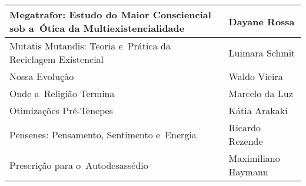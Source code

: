 \documentclass{gescons}
\begin{document}
\begin{longtable}[]{@{}
  >{\raggedright\arraybackslash}p{}
  >{\raggedright\arraybackslash}p{}@{}}
\hline
\begin{minipage}[b]{\linewidth}\raggedright
Megatrafor: Estudo do Maior Consciencial sob a~Ótica da Multiexistencialidade
\end{minipage} & \begin{minipage}[b]{\linewidth}\raggedright
Dayane Rossa
\end{minipage} \\
\hline
\begin{minipage}[b]{\linewidth}\raggedright
Mutatis Mutandis: Teoria e~Prática da Reciclagem Existencial
\end{minipage} & \begin{minipage}[b]{\linewidth}\raggedright
Luimara Schmit
\end{minipage} \\
\hline
\begin{minipage}[b]{\linewidth}\raggedright
Nossa Evolução
\end{minipage} & \begin{minipage}[b]{\linewidth}\raggedright
Waldo Vieira
\end{minipage} \\
\hline
\begin{minipage}[b]{\linewidth}\raggedright
Onde a~Religião Termina
\end{minipage} & \begin{minipage}[b]{\linewidth}\raggedright
Marcelo da Luz
\end{minipage} \\
\hline
\begin{minipage}[b]{\linewidth}\raggedright
Otimizações Pré-Tenepes
\end{minipage} & \begin{minipage}[b]{\linewidth}\raggedright
Kátia Arakaki
\end{minipage} \\
\hline
\begin{minipage}[b]{\linewidth}\raggedright
Pensenes: Pensamento, Sentimento e~Energia
\end{minipage} & \begin{minipage}[b]{\linewidth}\raggedright
Ricardo Rezende
\end{minipage} \\
\hline
\begin{minipage}[b]{\linewidth}\raggedright
Prescrição para o~Autodesassédio
\end{minipage} & \begin{minipage}[b]{\linewidth}\raggedright
Maximiliano Haymann
\end{minipage} \\

\end{longtable}
\end{document}
